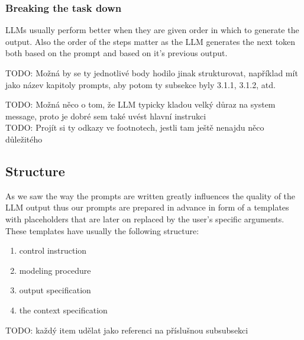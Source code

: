 \subsubsection{Breaking the task down}
LLMs usually perform better when they are given order in which to generate the output. Also the order of the steps matter as the LLM generates the next token both based on the prompt and based on it's previous output.



TODO: Možná by se ty jednotlivé body hodilo jinak strukturovat, například mít jako název kapitoly prompts, aby potom ty subsekce byly 3.1.1, 3.1.2, atd.

TODO: Možná něco o tom, že LLM typicky kladou velký důraz na system message, proto je dobré sem také uvést hlavní instrukci \\

TODO: Projít si ty odkazy ve footnotech, jestli tam ještě nenajdu něco důležitého \\


\subsection{Structure}

As we saw the way the prompts are written greatly influences the quality of the LLM output thus our prompts are prepared in advance in form of a templates with placeholders that are later on replaced by the user's specific arguments. These templates have usually the following structure:

\begin{enumerate}
\item control instruction
\item modeling procedure
\item output specification
\item the context specification \\
\end{enumerate}

TODO: každý item udělat jako referenci na příslušnou subsubsekci \\

